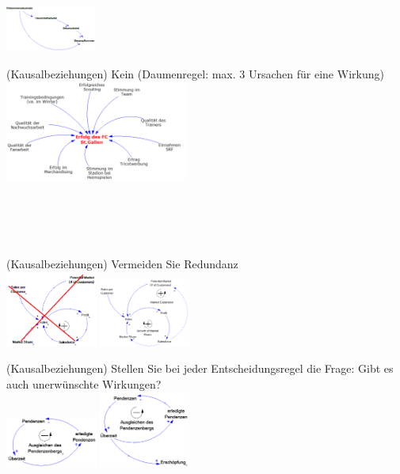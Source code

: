 \begin{multicols}{2}
\begin{compactenum}
		\includegraphics[width=0.225\textwidth]{pictures/regel_5_2}
		\item (Kausalbeziehungen) Kein  (Daumenregel: max. 3 Ursachen für	eine Wirkung) \\
		\includegraphics[width=0.45\textwidth]{pictures/regel_6} \\ \\ \\ \\ \\
		\item (Kausalbeziehungen) Vermeiden Sie Redundanz \\
		\includegraphics[width=0.225\textwidth]{pictures/regel_7} 
		\includegraphics[width=0.225\textwidth]{pictures/regel_7_2}
		\item (Kausalbeziehungen) Stellen Sie bei jeder Entscheidungsregel die Frage: Gibt es auch unerwünschte Wirkungen? \\
		\includegraphics[width=0.225\textwidth]{pictures/regel_8} 
		\includegraphics[width=0.225\textwidth]{pictures/regel_8_2}

\end{compactenum}
\end{multicols}
